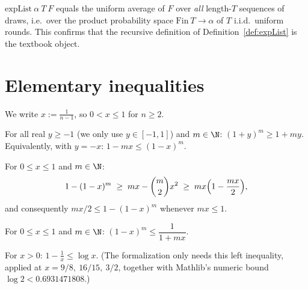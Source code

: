 \begin{theorem}\label{thm:faithful}
  \leanok
  $\mathrm{expList}\ \alpha\ T\ F$ equals the uniform average of $F$ over
  \emph{all} length-$T$ sequences of draws, i.e.\ over the product
  probability space $\mathrm{Fin}\ T \to \alpha$ of $T$ i.i.d.\ uniform
  rounds. This confirms that the recursive definition of
  Definition~\ref{def:expList} is the textbook object.
\end{theorem}

\section{Elementary inequalities}\label{sec:ineq}

We write $x := \tfrac{1}{n-1}$, so $0 < x \le 1$ for $n \ge 2$.

\begin{lemma}[Bernoulli]\label{lem:bernoulli}
  \leanok
  For all real $y \ge -1$ (we only use $y\in[-1,1]$) and $m \in \N$:
  $(1+y)^m \ge 1 + my$. Equivalently, with $y = -x$:
  $1 - mx \le (1-x)^m$.
\end{lemma}

\begin{lemma}\label{lem:bonferroni}
  \leanok
  For $0 \le x \le 1$ and $m \in \N$:
  \[
    1-(1-x)^m \;\ge\; mx - \binom{m}{2}x^2 \;\ge\; mx\Bigl(1-\frac{mx}{2}\Bigr),
  \]
  and consequently $mx/2 \le 1-(1-x)^m$ whenever $mx \le 1$.
\end{lemma}

\begin{lemma}\label{lem:upper}
  \leanok
  For $0 \le x \le 1$ and $m \in \N$: $(1-x)^m \le \dfrac{1}{1+mx}$.
\end{lemma}

\begin{lemma}\label{lem:logbounds}
  \leanok
  For $x > 0$: $1 - \tfrac1x \le \log x$. (The formalization only needs this
  left inequality, applied at $x = 9/8,\ 16/15,\ 3/2$, together with
  Mathlib's numeric bound $\log 2 < 0.6931471808$.)
\end{lemma}

